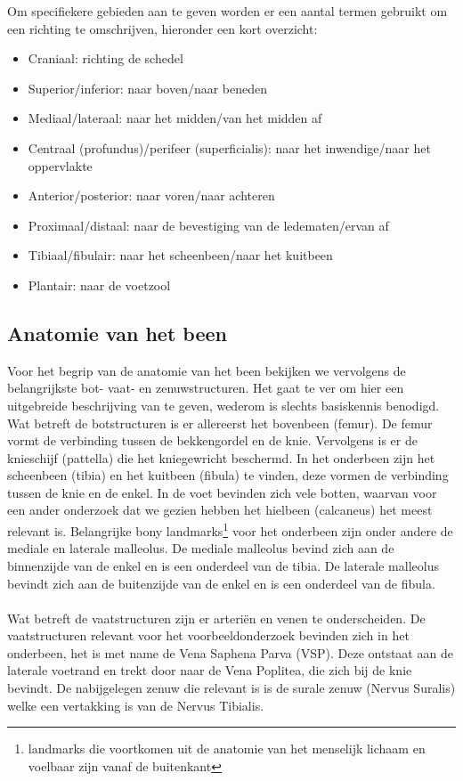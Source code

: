 \newpage

\noindent Om specifiekere gebieden aan te geven worden er een aantal termen gebruikt om een richting te omschrijven, hieronder een kort overzicht:
\begin{itemize}
	\item Craniaal: richting de schedel
	\item Superior/inferior: naar boven/naar beneden
	\item Mediaal/lateraal: naar het midden/van het midden af
	\item Centraal (profundus)/perifeer (superficialis): naar het inwendige/naar het oppervlakte
	\item Anterior/posterior: naar voren/naar achteren
	\item Proximaal/distaal: naar de bevestiging van de ledematen/ervan af
	\item Tibiaal/fibulair: naar het scheenbeen/naar het kuitbeen
	\item Plantair: naar de voetzool
\end{itemize}

\subsection{Anatomie van het been}

Voor het begrip van de anatomie van het been bekijken we vervolgens de belangrijkste bot- vaat- en zenuwstructuren. 
Het gaat te ver om hier een uitgebreide beschrijving van te geven, wederom is slechts basiskennis benodigd. 
Wat betreft de botstructuren is er allereerst het bovenbeen (femur). 
De femur vormt de verbinding tussen de bekkengordel en de knie. 
Vervolgens is er de knieschijf (pattella) die het kniegewricht beschermd. 
In het onderbeen zijn het scheenbeen (tibia) en het kuitbeen (fibula) te vinden, deze vormen de verbinding tussen de knie en de enkel. 
In de voet bevinden zich vele botten, waarvan voor een ander onderzoek dat we gezien hebben het hielbeen (calcaneus) het meest relevant is. 
Belangrijke bony landmarks\footnote{landmarks die voortkomen uit de anatomie van het menselijk lichaam en voelbaar zijn vanaf de buitenkant} voor het onderbeen zijn onder andere de mediale en laterale malleolus. 
De mediale malleolus bevind zich aan de binnenzijde van de enkel en is een onderdeel van de tibia. 
De laterale malleolus bevindt zich aan de buitenzijde van de enkel en is een onderdeel van de fibula.
\\
\\
Wat betreft de vaatstructuren zijn er arteri\"{e}n en venen te onderscheiden. 
De vaatstructuren relevant voor het voorbeeldonderzoek bevinden zich in het onderbeen, het is met name de Vena Saphena Parva (VSP). 
Deze ontstaat aan de laterale voetrand en trekt door naar de Vena Poplitea, die zich bij de knie bevindt. 
De nabijgelegen zenuw die relevant is is de surale zenuw (Nervus Suralis) welke een vertakking is van de Nervus Tibialis.


